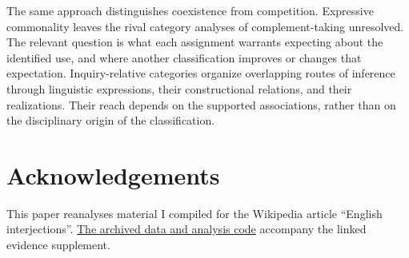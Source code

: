 \documentclass[12pt]{article}
\newif\ifblind
\begin{document}
The same approach distinguishes coexistence from competition. Expressive
commonality leaves the rival category analyses of complement-taking
 unresolved. The relevant
question is what each assignment warrants expecting about the identified
use, and where another classification improves or changes that expectation.
Inquiry-relative categories organize overlapping routes of inference through
linguistic expressions, their constructional relations, and their realizations.
Their reach depends on the supported
associations, rather than on the disciplinary origin of the classification.

\ifblind\else
\section*{Acknowledgements}

This paper reanalyses material I compiled for the Wikipedia article
\enquote{English interjections}.
\href{https://github.com/BrettRey/interjections-hpc/tree/master}{The archived
data and analysis code} accompany the linked evidence supplement.
\fi

\clearpage
\begingroup
\setlength{\emergencystretch}{3em}
\printbibliography
\endgroup
\end{document}
